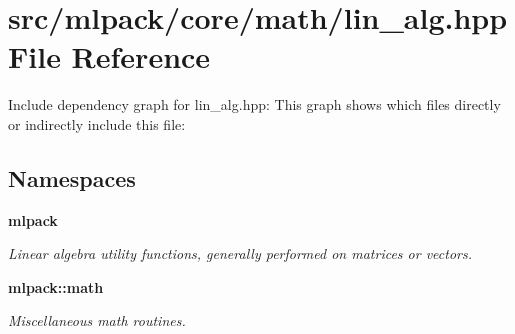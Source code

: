 \section{src/mlpack/core/math/lin\-\_\-alg.hpp File Reference}
\label{lin__alg_8hpp}
Include dependency graph for lin\-\_\-alg.\-hpp\-:
This graph shows which files directly or indirectly include this file\-:
\subsection*{Namespaces}
\begin{DoxyCompactItemize}
\item 
{\bf mlpack}
\begin{DoxyCompactList}\small\item\em Linear algebra utility functions, generally performed on matrices or vectors. \end{DoxyCompactList}\item 
{\bf mlpack\-::math}
\begin{DoxyCompactList}\small\item\em Miscellaneous math routines. \end{DoxyCompactList}\end{DoxyCompactItemize}
